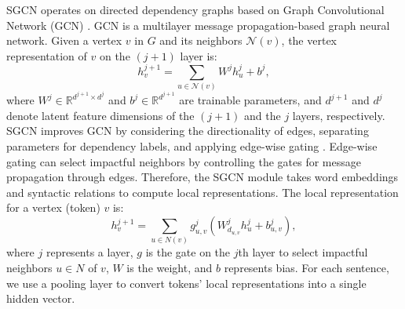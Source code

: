 \documentclass[letterpaper]{article} %
\begin{document}
SGCN operates on directed dependency graphs based on Graph Convolutional Network (GCN)
\cite{kipf-2016-semisupervised}.
GCN is a multilayer message propagation-based graph neural network.
Given a vertex $v$ in $G$ and its neighbors $\mathcal{N}(v)$, the vertex representation of $v$ on the $(j+1)$ layer is:
\begin{equation}
    h_v^{j+1} = \sum_{u\in\mathcal{N}(v)}W^{j}h_u^{j}+b^{j},
\end{equation}
where $W^{j}\in \mathbb{R}^{d^{j+1}\times d^{j}}$ and $b^{j}\in\mathbb{R}^{d^{j+1}}$ are trainable parameters, and $d^{j+1}$ and $d^{j}$ denote latent feature dimensions of the $(j+1)$ and the $j$ layers, respectively.
SGCN improves GCN by considering the directionality of edges, separating parameters for dependency labels, and applying edge-wise gating  \cite{bastings-2017-graph, li-2021-powering}.
Edge-wise gating can select impactful neighbors by controlling the gates for message propagation through edges.
Therefore, the SGCN module takes word embeddings and syntactic relations to compute local representations.
The local representation for a vertex (token) $v$ is:
\begin{equation}
h_{v}^{j+1}=\sum_{u\in N(v)}g_{u,v}^{j}(W_{d_{u,v}}^{j}h_{u}^{j}+b_{u,v}^{j}),
\label{eq:2}
\end{equation}
where $j$ represents a layer, $g$ is the gate on the $j$th layer to select impactful neighbors $u \in N$ of $v$, $W$ is the weight, and $b$ represents bias.
For each sentence, we use a pooling layer to convert tokens' local representations into a single hidden vector.
\end{document}
